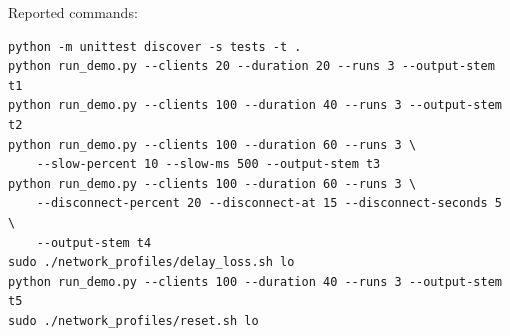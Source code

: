 \documentclass[11pt,a4paper]{article}
\begin{document}
Reported commands:
\begin{verbatim}
python -m unittest discover -s tests -t .
python run_demo.py --clients 20 --duration 20 --runs 3 --output-stem t1
python run_demo.py --clients 100 --duration 40 --runs 3 --output-stem t2
python run_demo.py --clients 100 --duration 60 --runs 3 \
    --slow-percent 10 --slow-ms 500 --output-stem t3
python run_demo.py --clients 100 --duration 60 --runs 3 \
    --disconnect-percent 20 --disconnect-at 15 --disconnect-seconds 5 \
    --output-stem t4
sudo ./network_profiles/delay_loss.sh lo
python run_demo.py --clients 100 --duration 40 --runs 3 --output-stem t5
sudo ./network_profiles/reset.sh lo
\end{verbatim}
\end{document}
